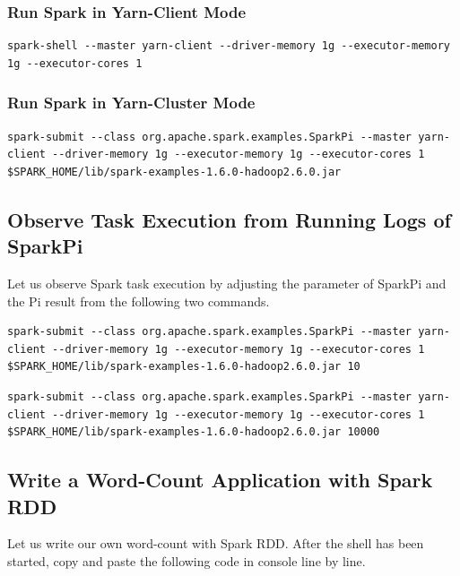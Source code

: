 \subsubsection{Run Spark in Yarn-Client
Mode}

\begin{lstlisting}
spark-shell --master yarn-client --driver-memory 1g --executor-memory 1g --executor-cores 1
\end{lstlisting}

\subsubsection{Run Spark in Yarn-Cluster
Mode}

\begin{lstlisting}
spark-submit --class org.apache.spark.examples.SparkPi --master yarn-client --driver-memory 1g --executor-memory 1g --executor-cores 1 $SPARK_HOME/lib/spark-examples-1.6.0-hadoop2.6.0.jar
\end{lstlisting}

\subsection{Observe Task Execution from Running Logs of SparkPi}

Let us observe Spark task execution by adjusting the parameter of
SparkPi and the Pi result from the following two commands.

\begin{lstlisting}
spark-submit --class org.apache.spark.examples.SparkPi --master yarn-client --driver-memory 1g --executor-memory 1g --executor-cores 1 $SPARK_HOME/lib/spark-examples-1.6.0-hadoop2.6.0.jar 10
\end{lstlisting}

\begin{lstlisting}
spark-submit --class org.apache.spark.examples.SparkPi --master yarn-client --driver-memory 1g --executor-memory 1g --executor-cores 1 $SPARK_HOME/lib/spark-examples-1.6.0-hadoop2.6.0.jar 10000
\end{lstlisting}

\subsection{Write a Word-Count Application with Spark RDD}

Let us write our own word-count with Spark RDD. After the shell has been
started, copy and paste the following code in console line by line.

